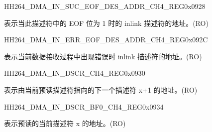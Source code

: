     
    \begin{register}{H}{H264\_DMA\_IN\_SUC\_EOF\_DES\_ADDR\_CH4\_REG}{0x0928}\label{regdesc:H264DMAINSUCEOFDESADDRCH4REG}
    \regnewline%
    \begin{regdesc}\begin{reglist}
    \label{fielddesc:H264DMAINSUCEOFDESADDRCH4}\item [H264\_DMA\_IN\_SUC\_EOF\_DES\_ADDR\_CH4] 表示当此描述符中的 EOF 位为 1 时的 inlink 描述符的地址。(RO)
    \end{reglist}\end{regdesc}
    \end{register}
    
    
    \begin{register}{H}{H264\_DMA\_IN\_ERR\_EOF\_DES\_ADDR\_CH4\_REG}{0x092C}\label{regdesc:H264DMAINERREOFDESADDRCH4REG}
    \regnewline%
    \begin{regdesc}\begin{reglist}
    \label{fielddesc:H264DMAINERREOFDESADDRCH4}\item [H264\_DMA\_IN\_ERR\_EOF\_DES\_ADDR\_CH4] 表示当前数据接收过程中出现错误时 inlink 描述符的地址。(RO)
    \end{reglist}\end{regdesc}
    \end{register}
    
    
    \begin{register}{H}{H264\_DMA\_IN\_DSCR\_CH4\_REG}{0x0930}\label{regdesc:H264DMAINDSCRCH4REG}
    \regnewline%
    \begin{regdesc}\begin{reglist}
    \label{fielddesc:H264DMAINLINKDSCRCH4}\item [H264\_DMA\_INLINK\_DSCR\_CH4] 表示由当前预读描述符指向的下一个描述符 x+1 的地址。(RO)
    \end{reglist}\end{regdesc}
    \end{register}
    
    
    \begin{register}{H}{H264\_DMA\_IN\_DSCR\_BF0\_CH4\_REG}{0x0934}\label{regdesc:H264DMAINDSCRBF0CH4REG}
    \regnewline%
    \begin{regdesc}\begin{reglist}
    \label{fielddesc:H264DMAINLINKDSCRBF0CH4}\item [H264\_DMA\_INLINK\_DSCR\_BF0\_CH4] 表示预读的当前描述符 x 的地址。(RO)
    \end{reglist}\end{regdesc}
    \end{register}
    
